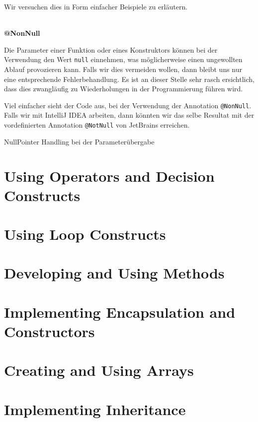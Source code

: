 Wir versuchen dies in Form einfacher Beispiele zu erläutern.

\textbf{\\@NonNull}

Die Parameter einer Funktion oder eines Konstruktors können bei der Verwendung 
den Wert {\tt null} einnehmen, was möglicherweise einen ungewollten Ablauf 
provozieren kann. Falls wir dies vermeiden wollen, dann bleibt uns nur eine 
entsprechende Fehlerbehandlung. Es ist an dieser Stelle sehr rasch ersichtlich, 
dass dies zwangläufig zu Wiederholungen in der Programmierung führen wird.






\mode*

Viel einfacher sieht der Code aus, bei der Verwendung der Annotation 
\texttt{@NonNull}. Falls wir mit IntelliJ IDEA arbeiten, dann
könnten wir das selbe Resultat mit der vordefinierten Annotation 
\texttt{@NotNull} von JetBrains erreichen.
	
\begin{listing}[h]
\label{lst:lombok-nonnull}
\caption{NullPointer Handling bei der Parameterübergabe}
\end{listing}



\section{Using Operators and Decision Constructs}
\section{Using Loop Constructs}
\section{Developing and Using Methods}
\section{Implementing Encapsulation and Constructors}
\section{Creating and Using Arrays}
\section{Implementing Inheritance}
